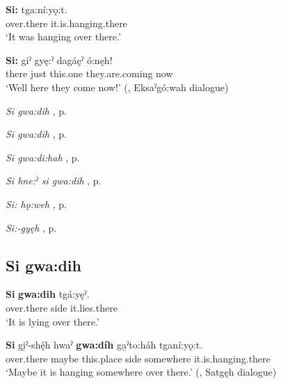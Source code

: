 \ea
\label{ex:spart47}
\gll \textbf{Si:} tga:ní:yǫ:t.\\
over.there it.is.hanging.there\\
\glt ‘It was hanging over there.’
\z

\ea
\label{ex:spart48}
\gll \textbf{Si:} giˀ gyę:ˀ dagáęˀ ó:nęh!\\
there just this.one they.are.coming now\\
\glt ‘Well here they come now!’ (\cite[88]{mithun_watewayestanih_1984}, Eksaˀgó:wah dialogue)
\z

\begin{CayugaRelated}
\item \textit{Si gwa:dih} , p. \pageref{p:[si gwa:dih] ‘move it!’}\\
\item \textit{Si gwa:dih} , p. \pageref{p:[si gwa:dih] ‘over there’}\\
\item \textit{Si gwa:di:hah} , p. \pageref{p:[si gwa:di:hah]}\\
\item \textit{Si hne:ˀ si gwa:dih} , p. \pageref{p:[si hne:ˀ si gwa:dih]}\\
\item \textit{Si: hǫ:weh} , p. \pageref{p:[si: hǫ:weh]}\\
\item \textit{Si:-gyęh} , p. \pageref{p:[si:-gyęh]}
\end{CayugaRelated}

\subsection*{\textbf{Si gwa:dih} } \label{p:[si gwa:dih] ‘over there’}

\ea
\label{ex:spart49}
\gll \textbf{Si} \textbf{gwa:dih} tgá:yęˀ.\\
over.there side it.lies.there\\
\glt ‘It is lying over there.’
\z

\ea
\label{ex:spart50}
\gll \textbf{Si} gi̱ˀ-shę́h hwaˀ \textbf{gwa:díh} ga̱ˀto:háh tganí:yǫ:t.\\
over.there maybe this.place side somewhere it.is.hanging.there\\
\glt ‘Maybe it is hanging somewhere over there.’ (\cite[142]{mithun_watewayestanih_1984}, Satgęh dialogue)
\z

